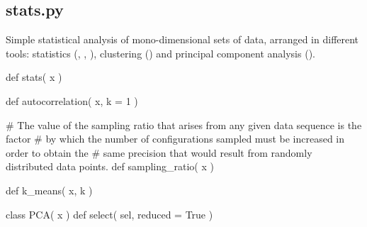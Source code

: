\normalsize
\subsection[stats]{stats.py}
Simple statistical analysis of mono-dimensional sets of data, arranged in different tools: statistics (,
, ), clustering () and principal component analysis ().

\begin{pyglist}[language=python,fvset={frame=single}]
def stats( x )

def autocorrelation( x, k = 1 )

# The value of the sampling ratio that arises from any given data sequence is the factor 
# by which the number of configurations sampled must be increased in order to obtain the
# same precision that would result from randomly distributed data points.
def sampling_ratio( x )

def k_means( x, k )

class PCA( x )
    def select( sel, reduced = True )
\end{pyglist}

